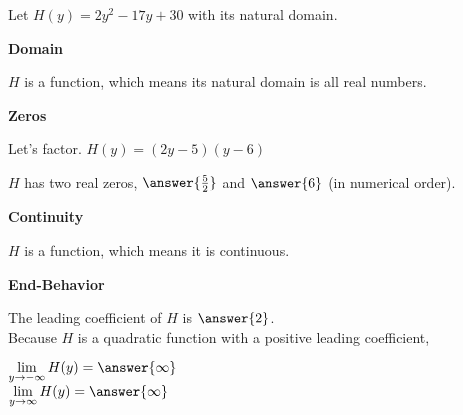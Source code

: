 \documentclass{ximera}
\author{Lee Wayand}
\begin{document}
\begin{exercise} 




Let $H(y) = 2y^2 - 17y + 30$ with its natural domain. \\




\begin{question}  \textbf{\textcolor{blue!55!black}{Domain}}


$H$ is a  function, which means its natural domain is all real numbers.

\end{question}








\begin{question}  \textbf{\textcolor{blue!55!black}{Zeros}}


Let's factor.  $H(y) = (2y-5)(y-6)$ 


$H$ has two real zeros, $\answer{\frac{5}{2}}$ and $\answer{6}$ (in numerical order).


\end{question}







\begin{question}  \textbf{\textcolor{blue!55!black}{Continuity}}


$H$ is a  function, which means it is continuous.

\end{question}









\begin{question}  \textbf{\textcolor{blue!55!black}{End-Behavior}}


The leading coefficient of $H$ is $\answer{2}$. \\


Because $H$ is a quadratic function with a positive leading coefficient,

$\lim\limits_{y \to -\infty} H(y) = \answer{\infty}$ \\


$\lim\limits_{y \to \infty} H(y) = \answer{\infty}$ \\


\end{question}
\end{exercise}
\end{document}
